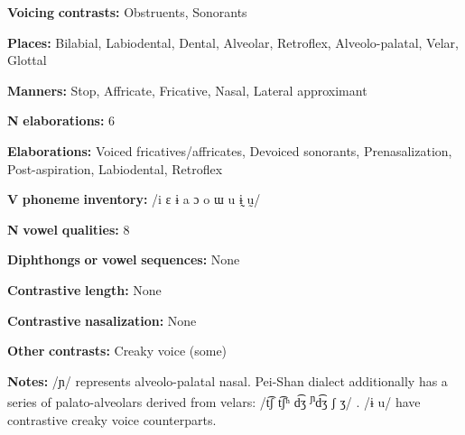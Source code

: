 \documentclass[output=paper]{langsci/langscibook}
\begin{document}
\begin{styleBody}
\textbf{Voicing} \textbf{contrasts:} Obstruents, Sonorants
\end{styleBody}

\begin{styleBody}
\textbf{Places:} Bilabial, Labiodental, Dental, Alveolar, Retroflex, Alveolo-palatal, Velar, Glottal
\end{styleBody}

\begin{styleBody}
\textbf{Manners:} Stop, Affricate, Fricative, Nasal, Lateral approximant
\end{styleBody}

\begin{styleBody}
\textbf{N} \textbf{elaborations:} 6
\end{styleBody}

\begin{styleBody}
\textbf{Elaborations:} Voiced fricatives/affricates, Devoiced sonorants, Prenasalization, Post-aspiration, Labiodental, Retroflex
\end{styleBody}

\begin{styleBody}
\textbf{V} \textbf{phoneme} \textbf{inventory:} /i ɛ ɨ a ɔ o ɯ u ɨ̰ ṵ/
\end{styleBody}

\begin{styleBody}
\textbf{N} \textbf{vowel} \textbf{qualities:} 8
\end{styleBody}

\begin{styleBody}
\textbf{Diphthongs} \textbf{or} \textbf{vowel} \textbf{sequences:} None
\end{styleBody}

\begin{styleBody}
\textbf{Contrastive} \textbf{length:} None
\end{styleBody}

\begin{styleBody}
\textbf{Contrastive} \textbf{nasalization:} None
\end{styleBody}

\begin{styleBody}
\textbf{Other} \textbf{contrasts:} Creaky voice (some)
\end{styleBody}

\begin{styleBody}
\textbf{Notes:} /ɲ/ represents alveolo-palatal nasal. Pei-Shan dialect additionally has a series of palato-alveolars derived from velars: /t͡ʃ t͡ʃʰ d͡ʒ \textsuperscript{ɲ}d͡ʒ ʃ ʒ/ \citep[68-9]{Maoji1997}. /ɨ u/ have contrastive creaky voice counterparts.
\end{styleBody}
\end{document}
